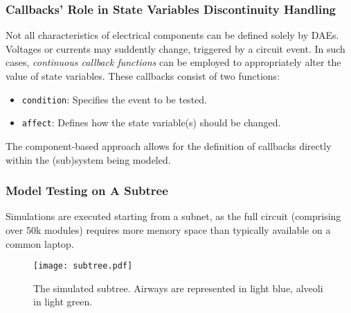 


\subsubsection{Callbacks' Role in State Variables Discontinuity
  Handling}
\label{subsubsec:callbacks}

Not all characteristics of electrical components can be defined solely
by DAEs.  Voltages or currents may suddently change, triggered by a
circuit event.  In such cases, \emph{continuous callback functions}
can be employed to appropriately alter the value of state variables.
These callbacks consist of two functions:
\begin{itemize}
\item \texttt{condition}: Specifies the event to be tested.
\item \texttt{affect}: Defines how the state variable(s) should be
  changed.
\end{itemize}

The component-based approach allows for the definition of callbacks
directly within the (sub)system being modeled.


\subsubsection{Model Testing on A Subtree}
\label{subsubsec:model_testing_on_subtree}

Simulations are executed starting from a subnet, as the full circuit
(comprising over 50k modules) requires more memory space than
typically available on a common laptop.

\begin{figure}[H]
  \centering
  \texttt{[image: subtree.pdf]}
  \caption{The simulated subtree.  Airways are represented in light blue, alveoli in light green.}
  \label{fig:subtree}
\end{figure}


